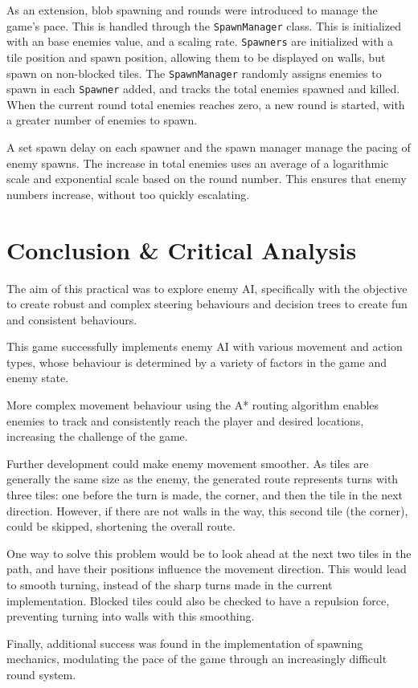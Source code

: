 \documentclass[a4paper, 12pt]{article}
\begin{document}
As an extension, blob spawning and rounds were introduced to manage the game's pace. This is handled through the \texttt{SpawnManager} class. This is initialized with an base enemies value, and a scaling rate. \texttt{Spawners} are initialized with a tile position and spawn position, allowing them to be displayed on walls, but spawn on non-blocked tiles. The \texttt{SpawnManager} randomly assigns enemies to spawn in each \texttt{Spawner} added, and tracks the total enemies spawned and killed. When the current round total enemies reaches zero, a new round is started, with a greater number of enemies to spawn.

A set spawn delay on each spawner and the spawn manager manage the pacing of enemy spawns. The increase in total enemies uses an average of a logarithmic scale and exponential scale based on the round number. This ensures that enemy numbers increase, without too quickly escalating.

\section{Conclusion \& Critical Analysis}

The aim of this practical was to explore enemy AI, specifically with the objective to create robust and complex steering behaviours and decision trees to create fun and consistent behaviours.

This game successfully implements enemy AI with various movement and action types, whose behaviour is determined by a variety of factors in the game and enemy state.

More complex movement behaviour using the A* routing algorithm enables enemies to track and consistently reach the player and desired locations, increasing the challenge of the game.

Further development could make enemy movement smoother. As tiles are generally the same size as the enemy, the generated route represents turns with three tiles: one before the turn is made, the corner, and then the tile in the next direction. However, if there are not walls in the way, this second tile (the corner), could be skipped, shortening the overall route.

One way to solve this problem would be to look ahead at the next two tiles in the path, and have their positions influence the movement direction. This would lead to smooth turning, instead of the sharp turns made in the current implementation. Blocked tiles could also be checked to have a repulsion force, preventing turning into walls with this smoothing.

Finally, additional success was found in the implementation of spawning mechanics, modulating the pace of the game through an increasingly difficult round system.
\end{document}
